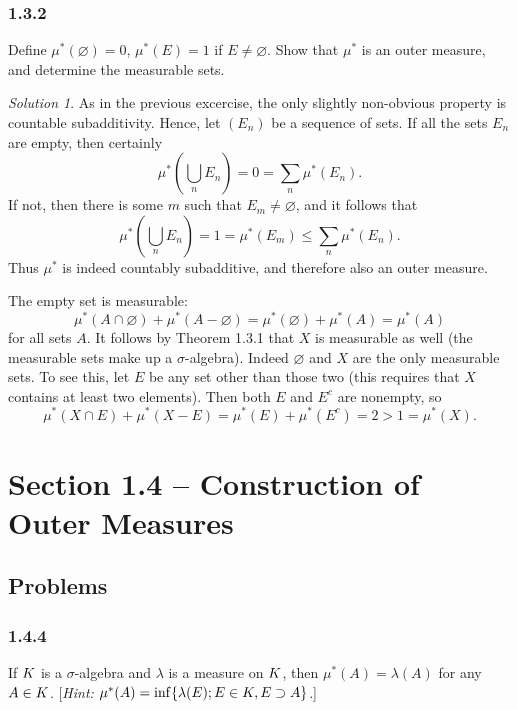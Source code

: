 \documentclass{report}
\let\sc\relax
\newcommand{\sc}[1]{\mathscr{#1}}
\theoremstyle{remark}
\newtheorem*{solution}{Solution}
\begin{document}
\subsubsection*{1.3.2}
Define $\mu^*(\varnothing) = 0$, $\mu^*(E) = 1$ if $E \ne \varnothing$. Show that $\mu^*$ is an outer measure, and determine the measurable sets.

\begin{solution}
  As in the previous excercise, the only slightly non-obvious property is countable subadditivity. Hence, let $(E_n)$ be a sequence of sets. If all the sets $E_n$ are empty, then certainly
  \begin{equation*}
    \mu^* \left( \bigcup_n E_n \right) = 0 = \sum_{n} \mu^*(E_n).
  \end{equation*}
  If not, then there is some $m$ such that $E_m \ne \varnothing$, and it follows that
  \begin{equation*}
    \mu^* \left( \bigcup_n E_n \right) = 1 = \mu^*(E_m) \le \sum_n \mu^*(E_n).
  \end{equation*}
  Thus $\mu^*$ is indeed countably subadditive, and therefore also an outer measure.

  The empty set is measurable:
  \begin{equation*}
    \mu^*(A \cap \varnothing) + \mu^*(A - \varnothing) = \mu^*(\varnothing) + \mu^*(A) = \mu^*(A)
  \end{equation*}
  for all sets $A$. It follows by Theorem 1.3.1 that $X$ is measurable as well (the measurable sets make up a $\sigma$-algebra). Indeed $\varnothing$ and $X$ are the only measurable sets. To see this, let $E$ be any set other than those two (this requires that $X$ contains at least two elements). Then both $E$ and $E^c$ are nonempty, so
  \begin{equation*}
    \mu^*(X \cap E) + \mu^*(X - E) = \mu^*(E) + \mu^*(E^c) = 2 > 1 = \mu^*(X).
  \end{equation*}
\end{solution}


\section*{Section 1.4 -- Construction of Outer Measures}

\subsection*{Problems}

\subsubsection*{1.4.4}
If $\sc K$ is a $\sigma$-algebra and $\lambda$ is a measure on $\sc K$, then $\mu^*(A) = \lambda(A)$ for any $A \in \sc K$. [\emph{Hint:} $\mu^*(A) = \inf \{\lambda(E); E \in \sc K, E \supset A\}$.]
\end{document}
